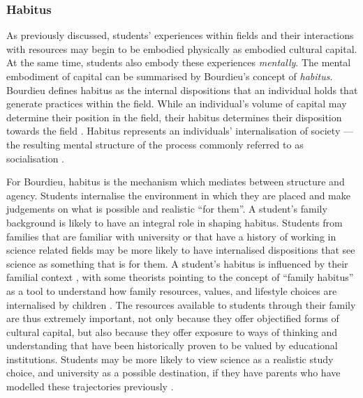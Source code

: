 \documentclass[smallextended]{svjour3}       %
\begin{document}
\subsubsection*{Habitus}
As previously discussed, students' experiences within fields and their interactions with resources may begin to be embodied physically as embodied cultural capital. At the same time, students also embody these experiences \textit{mentally}. The mental embodiment of capital can be summarised by Bourdieu's concept  of \textit{habitus}. Bourdieu defines habitus as the internal dispositions that an individual holds that generate practices within the field. While an individual's volume of capital may determine their position in the field, their habitus determines their disposition towards the field \cite{bourdieu1992invitation}. Habitus represents an individuals' internalisation of society --- the resulting mental structure of the process commonly referred to as socialisation \cite{Nash1999}.

For Bourdieu, habitus is the mechanism which mediates between structure and agency. Students internalise the environment in which they are placed and make judgements on what is possible and realistic ``for them''. A student's family background is likely to have an integral role in shaping habitus. Students from families that are familiar with university or that have a history of working in science related fields may be more likely to have internalised dispositions that see science as something that is for them. A student's habitus is influenced by their familial context \cite{Dimaggio1982}, with some theorists pointing to the concept of ``family habitus'' as a tool to understand how family resources, values, and lifestyle choices are internalised by children \cite{Archer2012,tomanovic2004family}. The resources available to students through their family are thus extremely important, not only because they offer objectified forms of cultural capital, but also because they offer exposure to ways of thinking and understanding that have been historically proven to be valued by educational institutions. Students may be more likely to view science as a realistic study choice, and university as a possible destination, if they have parents who have modelled these trajectories previously \cite{Lyons_2006}. 
\end{document}
